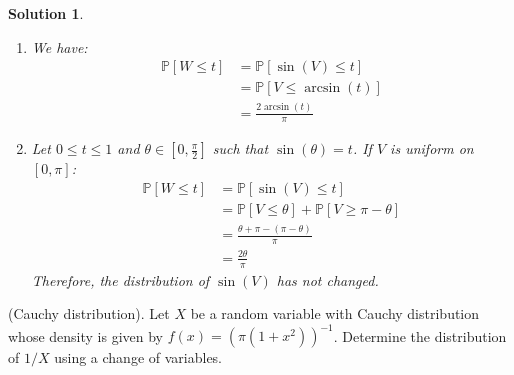 \documentclass{article}
\newcommand{\proba}[1]{\mathbb{P}[#1]}
\newtheorem{solution}{Solution}
\begin{document}
\begin{solution}
  \begin{enumerate}
    \item We have:
          \begin{align*}
            \proba{W \leq t} & = \proba{\sin(V) \leq t}    \\
                             & = \proba{V \leq \arcsin(t)} \\
                             & = \frac{2 \arcsin(t)}{\pi}
          \end{align*}
    \item Let $0 \leq t \leq 1$ and $\theta \in [0, \frac{\pi}{2}]$ such that
          $\sin(\theta) = t$. If $V$ is uniform on $[0, \pi]$:
          \begin{align*}
            \proba{W \leq t} & = \proba{\sin(V) \leq t}                              \\
                             & = \proba{V \leq \theta} + \proba{V \geq \pi - \theta} \\
                             & = \frac{\theta + \pi - (\pi - \theta)}{\pi}           \\
                             & = \frac{2 \theta}{\pi}
          \end{align*}
          Therefore, the distribution of $\sin(V)$ has not changed.
  \end{enumerate}
\end{solution}

\begin{Exercise} (Cauchy distribution). Let $X$ be a random variable with Cauchy distribution whose density is given by $f(x)={\left(\pi\left(1+x^{2}\right)\right)}^{-1}$. Determine the distribution of $1 / X$ using a change of variables.
\end{Exercise}
\end{document}
